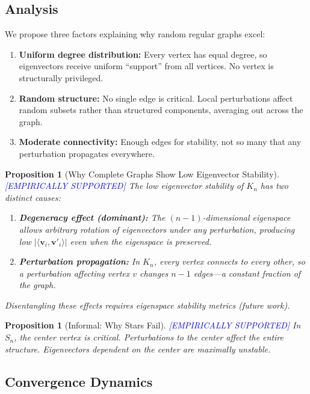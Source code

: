 \documentclass[11pt,a4paper]{article}
\newtheorem{proposition}[theorem]{Proposition}
\theoremstyle{definition}
\theoremstyle{remark}
\newcommand{\inner}[2]{\langle #1, #2 \rangle}
\newcommand{\supported}{\textcolor{blue}{[EMPIRICALLY SUPPORTED]}}
\begin{document}
\subsection{Analysis}

We propose three factors explaining why random regular graphs excel:

\begin{enumerate}
    \item \textbf{Uniform degree distribution:} Every vertex has equal degree, so eigenvectors receive uniform ``support'' from all vertices. No vertex is structurally privileged.
    
    \item \textbf{Random structure:} No single edge is critical. Local perturbations affect random subsets rather than structured components, averaging out across the graph.
    
    \item \textbf{Moderate connectivity:} Enough edges for stability, not so many that any perturbation propagates everywhere.
\end{enumerate}

\begin{proposition}[Why Complete Graphs Show Low Eigenvector Stability] \supported
The low eigenvector stability of $K_n$ has two distinct causes:
\begin{enumerate}[label=(\roman*)]
    \item \textbf{Degeneracy effect (dominant):} The $(n-1)$-dimensional eigenspace allows arbitrary rotation of eigenvectors under any perturbation, producing low $|\inner{\mathbf{v}_i}{\mathbf{v}'_i}|$ even when the eigenspace is preserved.
    \item \textbf{Perturbation propagation:} In $K_n$, every vertex connects to every other, so a perturbation affecting vertex $v$ changes $n-1$ edges---a constant fraction of the graph.
\end{enumerate}
Disentangling these effects requires eigenspace stability metrics (future work).
\end{proposition}

\begin{proposition}[Informal: Why Stars Fail] \supported
In $S_n$, the center vertex is critical. Perturbations to the center affect the entire structure. Eigenvectors dependent on the center are maximally unstable.
\end{proposition}

\subsection{Convergence Dynamics}
\end{document}
